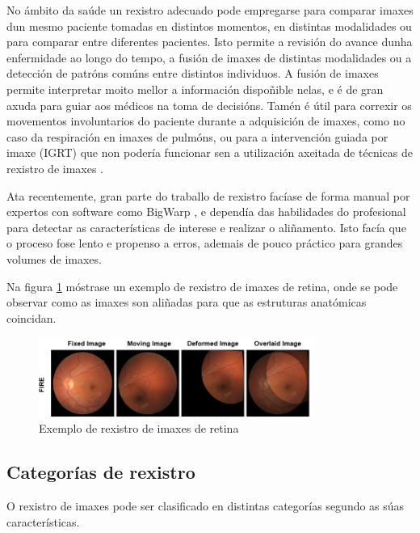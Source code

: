 No ámbito da saúde un rexistro adecuado pode empregarse para comparar imaxes dun mesmo paciente tomadas en distintos momentos, en distintas modalidades ou para comparar entre diferentes pacientes.
Isto permite a revisión do avance dunha enfermidade ao longo do tempo, a fusión de imaxes de distintas modalidades ou a detección de patróns comúns entre distintos individuos.
A fusión de imaxes permite interpretar moito mellor a información dispoñible nelas, e é de gran axuda para guiar aos médicos na toma de decisións.
Tamén é útil para correxir os movementos involuntarios do paciente durante a adquisición de imaxes, como no caso da respiración en imaxes de pulmóns, ou para a intervención guiada por imaxe (\gls{IGRT}) que non 
podería funcionar sen a utilización axeitada de técnicas de rexistro de imaxes \cite{wang2022neuralrenderingstereo3d}. 

Ata recentemente, gran parte do traballo de rexistro facíase de forma manual por expertos con software como BigWarp \cite{bigwarp}, 
e dependía das habilidades do profesional para detectar as características de interese e realizar o aliñamento.
Isto facía que o proceso fose lento e propenso a erros, ademais de pouco práctico para grandes volumes de imaxes.

Na figura \ref{fig:retin_reg} móstrase un exemplo de rexistro de imaxes de retina, onde se pode observar como as imaxes son aliñadas para que as estruturas anatómicas coincidan.

\begin{figure}[tbp]
    \centering
    \includegraphics[width=0.8\textwidth]{imaxes/retin-reg.png}
    \caption{Exemplo de rexistro de imaxes de retina \cite{sivaraman2024retinaregnetzeroshotapproachretinal}}
    \label{fig:retin_reg}
\end{figure}

\subsection{Categorías de rexistro}
\label{subsec:Categorías de rexistro}

O rexistro de imaxes pode ser clasificado en distintas categorías segundo as súas características.

